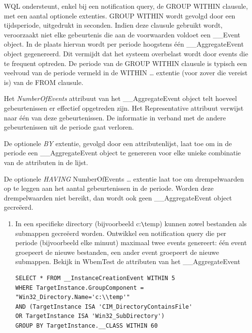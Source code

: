 \documentclass[11pt,a4paper]{report}
\begin{document}
WQL ondersteunt, enkel bij een notification query, de GROUP WITHIN clausule, met een aantal optionele extenties. GROUP WITHIN wordt gevolgd door een tijdsperiode, uitgedrukt in seconden. Indien deze clausule gebruikt wordt, veroorzaakt niet elke gebeurtenis die aan de voorwaarden voldoet een \_\_Event object. In de plaats hiervan wordt per periode hoogstens één \_\_AggregateEvent object gegenereerd. Dit vermijdt dat het systeem overbelast wordt door events die te frequent optreden. De periode van de GROUP WITHIN clausule is typisch een veelvoud van de periode vermeld in de WITHIN … extentie (voor zover die vereist is) van de FROM clausule.
\par Het \textit{NumberOfEvents} attribuut van het \_\_AggregateEvent object telt hoeveel gebeurtenissen er effectief opgetreden zijn. Het Representative attribuut verwijst naar één van deze gebeurtenissen. De informatie in verband met de andere gebeurtenissen uit de periode gaat verloren.
\newpage
\par De optionele \textit{BY} extentie, gevolgd door een attributenlijst, laat toe om in de periode een \_\_AggregateEvent object te genereren voor elke unieke combinatie van de attributen in de lijst. 
\par De optionele \textit{HAVING} NumberOfEvents … extentie laat toe om drempelwaarden op te leggen aan het aantal gebeurtenissen in de periode. Worden deze drempelwaarden niet bereikt, dan wordt ook geen \_\_AggregateEvent object gecreëerd.
\begin{enumerate}[resume]
	\item In een specifieke directory (bijvoorbeeld c:\verb+\+temp) kunnen zowel bestanden als submappen gecreëerd worden. Ontwikkel een notification query die per periode (bijvoorbeeld elke minuut) maximaal twee events genereert: één event groepeert de nieuwe bestanden, een ander event groepeert de nieuwe submappen. Bekijk in WbemTest de attributen van het \_\_AggregateEvent
	\begin{lstlisting}
SELECT * FROM __InstanceCreationEvent WITHIN 5
WHERE TargetInstance.GroupComponent = "Win32_Directory.Name='c:\\temp'"
AND (TargetInstance ISA 'CIM_DirectoryContainsFile'
OR TargetInstance ISA 'Win32_SubDirectory')
GROUP BY TargetInstance.__CLASS WITHIN 60 
	\end{lstlisting}
\end{enumerate}
\end{document}
